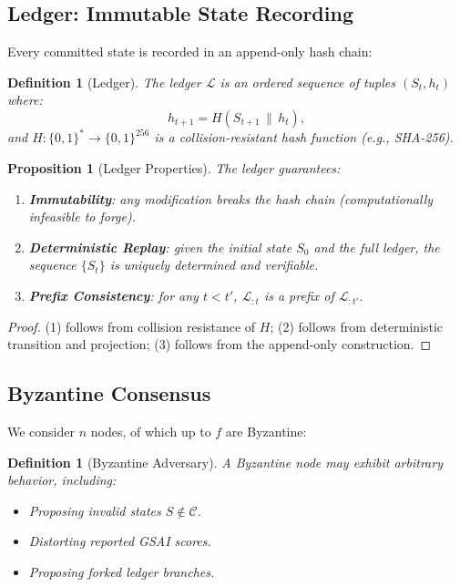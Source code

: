 \documentclass[11pt,letterpaper]{article}
\newtheorem{definition}[theorem]{Definition}
\newtheorem{proposition}[theorem]{Proposition}
\newcommand{\cC}{\mathcal{C}}
\newcommand{\cL}{\mathcal{L}}
\begin{document}
\subsection{Ledger: Immutable State Recording}

Every committed state is recorded in an append-only hash chain:

\begin{definition}[Ledger]
The ledger $\cL$ is an ordered sequence of tuples
$(S_t, h_t)$ where:
\begin{equation}
    h_{t+1} = H(S_{t+1} \,\|\, h_t),
    \label{eq:ledger}
\end{equation}
and $H: \{0,1\}^* \to \{0,1\}^{256}$ is a collision-resistant hash
function (e.g., SHA-256).
\end{definition}

\begin{proposition}[Ledger Properties]
\label{prop:ledger}
The ledger guarantees:
\begin{enumerate}[nosep]
    \item \textbf{Immutability}: any modification breaks the hash chain
    (computationally infeasible to forge).
    \item \textbf{Deterministic Replay}: given the initial state $S_0$ and
    the full ledger, the sequence $\{S_t\}$ is uniquely determined and
    verifiable.
    \item \textbf{Prefix Consistency}: for any $t < t'$,
    $\cL_{:t}$ is a prefix of $\cL_{:t'}$.
\end{enumerate}
\end{proposition}
\begin{proof}
(1) follows from collision resistance of $H$; (2) follows from
deterministic transition and projection; (3) follows from the
append-only construction.
\end{proof}

\subsection{Byzantine Consensus}

We consider $n$ nodes, of which up to $f$ are Byzantine:

\begin{definition}[Byzantine Adversary]
A Byzantine node may exhibit arbitrary behavior, including:
\begin{itemize}[nosep]
    \item Proposing invalid states $S \notin \cC$.
    \item Distorting reported GSAI scores.
    \item Proposing forked ledger branches.
\end{itemize}
\end{definition}
\end{document}
